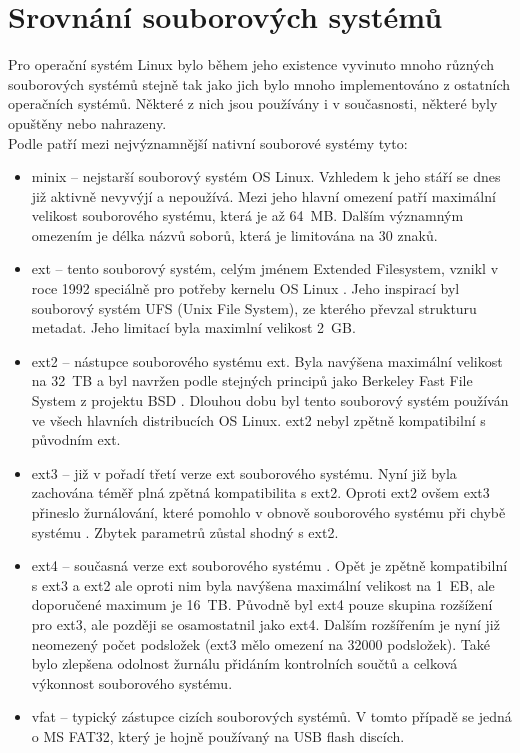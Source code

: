 \section{Srovnání souborových systémů}
Pro operační systém Linux bylo během jeho existence vyvinuto mnoho různých souborových systémů stejně tak jako jich bylo mnoho implementováno z ostatních operačních systémů. Některé z nich jsou používány i v současnosti, některé byly opuštěny nebo nahrazeny.\\
Podle \cite{tldp-filesystem} patří mezi nejvýznamnější nativní souborové systémy tyto:
\begin{itemize}
    \item minix -- nejstarší souborový systém OS Linux. Vzhledem k jeho stáří se dnes již aktivně nevyvýjí a nepoužívá. Mezi jeho hlavní omezení patří maximální velikost souborového systému, která je až 64~MB. Dalším významným omezením je délka názvů soborů, která je limitována na 30 znaků.
    \item ext -- tento souborový systém, celým jménem Extended Filesystem, vznikl v roce 1992 speciálně pro potřeby kernelu OS Linux \cite{wiki-ext}. Jeho inspirací byl souborový systém UFS (Unix File System), ze kterého převzal strukturu metadat. Jeho limitací byla maximlní velikost 2~GB.
    \item ext2 -- nástupce souborového systému ext. Byla navýšena maximální velikost na 32~TB a byl navržen podle stejných principů jako Berkeley Fast File System z projektu BSD \cite{wiki-ext2}. Dlouhou dobu byl tento souborový systém používán ve všech hlavních distribucích OS Linux. ext2 nebyl zpětně kompatibilní s původním ext.
    \item ext3 -- již v pořadí třetí verze ext souborového systému. Nyní již byla zachována téměř plná zpětná kompatibilita s ext2. Oproti ext2 ovšem ext3 přineslo žurnálování, které pomohlo v obnově souborového systému při chybě systému \cite{wiki-ext3}. Zbytek parametrů zůstal shodný s ext2.
    \item ext4 -- současná verze ext souborového systému \cite{wiki-ext4}. Opět je zpětně kompatibilní s ext3 a ext2 ale oproti nim byla navýšena maximální velikost na 1~EB, ale doporučené maximum je 16~TB. Původně byl ext4 pouze skupina rozšížení pro ext3, ale později se osamostatnil jako ext4. Dalším rozšířením je nyní již neomezený počet podsložek (ext3 mělo omezení na 32000 podsložek). Také bylo zlepšena odolnost žurnálu přidáním kontrolních součtů a celková výkonnost souborového systému.
    \item vfat -- typický zástupce cizích souborových systémů. V tomto případě se jedná o MS FAT32, který je hojně používaný na USB flash discích.

\end{itemize}
